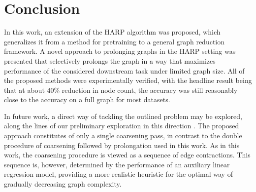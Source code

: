 \section{Conclusion}

In this work, an extension of the HARP algorithm was proposed, which generalizes it from a method for pretraining to a general graph reduction framework. A novel approach to prolonging graphs in the HARP setting was presented that selectively prolongs the graph in a way that maximizes performance of the considered downstream task under limited graph size. All of the proposed methods were experimentally verified, with the headline result being that at about 40\% reduction in node count, the accuracy was still reasonably close to the accuracy on a full graph for most datasets.

In future work, a direct way of tackling the outlined problem may be explored, along the lines of our preliminary exploration in this direction \cite{prochazka_downstream_2022}. The proposed approach constitutes of only a single coarsening pass, in contrast to the double procedure of coarsening followed by prolongation used in this work. As in this work, the coarsening procedure is viewed as a sequence of edge contractions. This sequence is, however, determined by the performance of an auxiliary linear regression model, providing a more realistic heuristic for the optimal way of gradually decreasing graph complexity.
